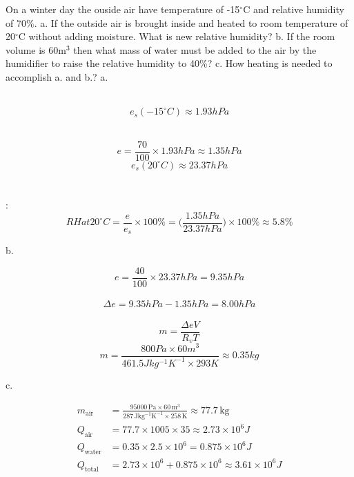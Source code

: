 \documentclass[fleqn,10pt]{SelfArx} %
\begin{document}
\newpage
\begin{question}[\lable=18.1]{On a winter day the ouside air have temperature of -15$^\circ$C and relative humidity of $70\%$.\newline
    a. If the outside air is brought inside and heated to room temperature of 20$^\circ$C without adding moisture. What is new relative humidity?\newline
    b. If the room volume is 60m$^3$ then what mass of water must be added to the air by the humidifier to raise the relative humidity to 40\%?\newline
    c. How heating is needed to accomplish a. and b.?
    }
    \Rightarrow
        \Rightarrow a.  \\  \\ 

            $$e_s(-15^\circ C) \approx 1.93 hPa$$
         \\ 

            $$e =\frac{70}{100}\times 1.93 hPa \approx 1.35hPa$$
            $$e_s(20^\circ C) \approx 23.37 hPa$$
         \\  \\ :
        $$RH at 20^\circ C = \frac{e}{e_s} \times 100\% = \Big(\frac{1.35 hPa}{23.37hPa}\Big) \times 100\% \approx 5.8\%$$

        \Rightarrow b. 

        $$e= \frac{40}{100} \times 23.37hPa = 9.35hPa$$
         \\ 
            $$\Delta e=9.35hPa - 1.35hPa = 8.00hPa$$
        \\ 
            $$m= \frac{\Delta eV}{R_v T}$$
            $$m= \frac{800Pa \times 60 m^3}{461.5Jkg^{-1} K^{-1} \times 293K} \approx 0.35kg$$

    \Rightarrow c. 

    \begin{align*}
        m_{\text{air}} &= \frac{95000 \, \mathrm{Pa} \times 60 \, \mathrm{m^3}}{287 \, \mathrm{Jkg^{-1}K^{-1}} \times 258 \, \mathrm{K}} \approx 77.7 \, \mathrm{kg} \\
        Q_{\text{air}} &= 77.7 \times 1005 \times 35 \approx 2.73 \times 10^6 J \\
        Q_{\text{water}} &= 0.35 \times 2.5 \times 10^6 = 0.875 \times 10^6 J\\
        Q_{\text{total}} &= 2.73 \times 10^6 + 0.875 \times 10^6 \approx 3.61 \times 10^6 J
    \end{align*}
\end{question}
\end{document}
